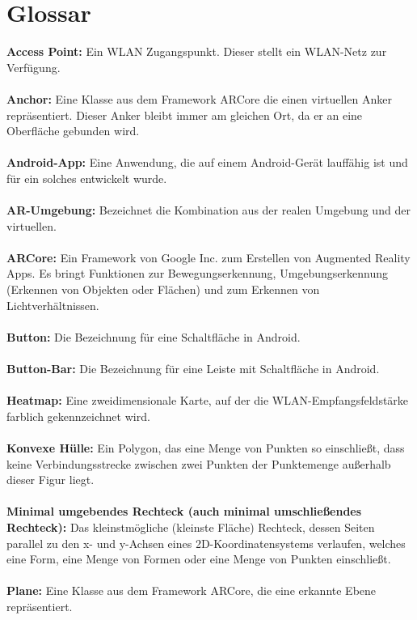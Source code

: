 \documentclass[10pt]{scrartcl}
\begin{document}
\section{Glossar}
\textbf{Access Point:} Ein WLAN Zugangspunkt. Dieser stellt ein WLAN-Netz zur Verfügung.\\~\\
\textbf{Anchor:} Eine Klasse aus dem Framework ARCore die einen virtuellen Anker repräsentiert. Dieser Anker bleibt immer am gleichen Ort, da er an eine Oberfläche gebunden wird.\\~\\
\textbf{Android-App:} Eine Anwendung, die auf einem Android-Gerät lauffähig ist und für ein solches entwickelt wurde.\\~\\
\textbf{AR-Umgebung:} Bezeichnet die Kombination aus der realen Umgebung und der virtuellen.\\~\\
\textbf{ARCore:} Ein Framework von Google Inc. zum Erstellen von Augmented Reality Apps. Es bringt Funktionen zur Bewegungserkennung, Umgebungserkennung (Erkennen von Objekten oder Flächen) und zum Erkennen von Lichtverhältnissen.\\~\\
\textbf{Button:} Die Bezeichnung für eine Schaltfläche in Android.\\~\\
\textbf{Button-Bar:} Die Bezeichnung für eine Leiste mit Schaltfläche in Android.\\~\\
\textbf{Heatmap:} Eine zweidimensionale Karte, auf der die WLAN-Empfangsfeldstärke farblich gekennzeichnet wird.\\~\\
\textbf{Konvexe Hülle:} Ein Polygon, das eine Menge von Punkten so einschließt, dass keine Verbindungsstrecke zwischen zwei Punkten der Punktemenge außerhalb dieser Figur liegt.\\~\\
\textbf{Minimal umgebendes Rechteck (auch minimal umschließendes Rechteck):} Das kleinstmögliche (kleinste Fläche) Rechteck, dessen Seiten parallel zu den x- und y-Achsen eines 2D-Koordinatensystems verlaufen, welches eine Form, eine Menge von Formen oder eine Menge von Punkten einschließt.\\~\\
\textbf{Plane:} Eine Klasse aus dem Framework ARCore, die eine erkannte Ebene repräsentiert.\\~\\
\end{document}
